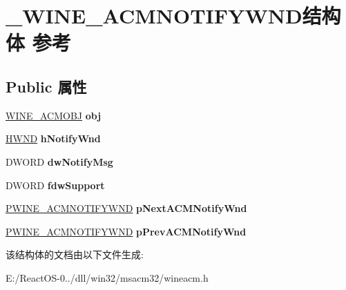 \hypertarget{struct___w_i_n_e___a_c_m_n_o_t_i_f_y_w_n_d}{}\section{\+\_\+\+W\+I\+N\+E\+\_\+\+A\+C\+M\+N\+O\+T\+I\+F\+Y\+W\+N\+D结构体 参考}
\label{struct___w_i_n_e___a_c_m_n_o_t_i_f_y_w_n_d}
\subsection*{Public 属性}
\begin{DoxyCompactItemize}
\item 
\mbox{\label{struct___w_i_n_e___a_c_m_n_o_t_i_f_y_w_n_d_a097dbc2b8c4371c521460a42dea32d7b}} 
\hyperlink{struct___w_i_n_e___a_c_m_o_b_j}{W\+I\+N\+E\+\_\+\+A\+C\+M\+O\+BJ} {\bfseries obj}
\item 
\mbox{\label{struct___w_i_n_e___a_c_m_n_o_t_i_f_y_w_n_d_afbff12160c847f8ccfd03b299e0e483d}} 
\hyperlink{interfacevoid}{H\+W\+ND} {\bfseries h\+Notify\+Wnd}
\item 
\mbox{\label{struct___w_i_n_e___a_c_m_n_o_t_i_f_y_w_n_d_a5fe89cfa97e4b0fd08ab7f1de4066cfa}} 
D\+W\+O\+RD {\bfseries dw\+Notify\+Msg}
\item 
\mbox{\label{struct___w_i_n_e___a_c_m_n_o_t_i_f_y_w_n_d_a8f9604a954508016a01173ed3a07e57f}} 
D\+W\+O\+RD {\bfseries fdw\+Support}
\item 
\mbox{\label{struct___w_i_n_e___a_c_m_n_o_t_i_f_y_w_n_d_aa147e1ef26fa171a826e448031bf8755}} 
\hyperlink{struct___w_i_n_e___a_c_m_n_o_t_i_f_y_w_n_d}{P\+W\+I\+N\+E\+\_\+\+A\+C\+M\+N\+O\+T\+I\+F\+Y\+W\+ND} {\bfseries p\+Next\+A\+C\+M\+Notify\+Wnd}
\item 
\mbox{\label{struct___w_i_n_e___a_c_m_n_o_t_i_f_y_w_n_d_ab49de0260c8f4bb682746766a7f22a37}} 
\hyperlink{struct___w_i_n_e___a_c_m_n_o_t_i_f_y_w_n_d}{P\+W\+I\+N\+E\+\_\+\+A\+C\+M\+N\+O\+T\+I\+F\+Y\+W\+ND} {\bfseries p\+Prev\+A\+C\+M\+Notify\+Wnd}
\end{DoxyCompactItemize}


该结构体的文档由以下文件生成\+:\begin{DoxyCompactItemize}
\item 
E\+:/\+React\+O\+S-\/0../dll/win32/msacm32/wineacm.\+h\end{DoxyCompactItemize}
